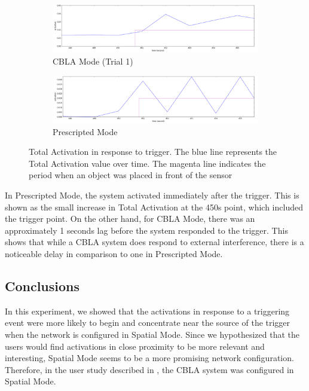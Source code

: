 \begin{figure}[!htb]
	\centering
	\begin{subfigure}[t]{0.9\textwidth}
		\centering
		\includegraphics[width=1.0 \textwidth]{"fig/validations/CBLA_responsiveness_c"}
		\caption{CBLA Mode (Trial 1)}
		\label{fig:response_plot_cbla}
	\end{subfigure}
	
	\begin{subfigure}[t]{0.9\textwidth}
		\centering
		\includegraphics[width=1.0 \textwidth]{"fig/validations/Prescripted_responsiveness_c"}
		\caption{Prescripted Mode}
		\label{fig:response_plot_prescripted}
	\end{subfigure}
	\caption[Total Activation in response to trigger plots]{Total Activation in response to trigger. The blue line represents the Total Activation value over time. The magenta line indicates the period when an object was placed in front of the sensor}
	\label{fig:Response_to_trigger_plot}
\end{figure}

In Prescripted Mode, the system activated immediately after the trigger. This is shown as the small increase in Total Activation at the 450s point, which included the trigger point. On the other hand, for CBLA Mode, there was an approximately 1 seconds lag before the system responded to the trigger. This shows that while a CBLA system does respond to external interference, there is a noticeable delay in comparison to one in Prescripted Mode. 

\subsection{Conclusions}

In this experiment, we showed that the activations in response to a triggering event were more likely to begin and concentrate near the source of the trigger when the network is configured in Spatial Mode. Since we hypothesized that the users would find activations in close proximity to be more relevant and interesting, Spatial Mode seems to be a more promising network configuration. Therefore, in the user study described in , the CBLA system was configured in Spatial Mode. 

